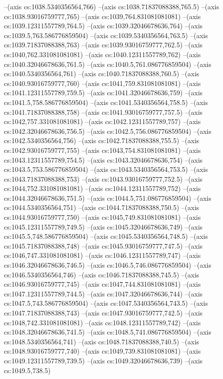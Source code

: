 --(axis cs:1038.5340356564,766)
--(axis cs:1038.71837088388,765.5)
--(axis cs:1038.93016759777,765)
--(axis cs:1039,764.831081081081)
--(axis cs:1039.12311557789,764.5)
--(axis cs:1039.32046678636,764)
--(axis cs:1039.5,763.586776859504)
--(axis cs:1039.5340356564,763.5)
--(axis cs:1039.71837088388,763)
--(axis cs:1039.93016759777,762.5)
--(axis cs:1040,762.331081081081)
--(axis cs:1040.12311557789,762)
--(axis cs:1040.32046678636,761.5)
--(axis cs:1040.5,761.086776859504)
--(axis cs:1040.5340356564,761)
--(axis cs:1040.71837088388,760.5)
--(axis cs:1040.93016759777,760)
--(axis cs:1041,759.831081081081)
--(axis cs:1041.12311557789,759.5)
--(axis cs:1041.32046678636,759)
--(axis cs:1041.5,758.586776859504)
--(axis cs:1041.5340356564,758.5)
--(axis cs:1041.71837088388,758)
--(axis cs:1041.93016759777,757.5)
--(axis cs:1042,757.331081081081)
--(axis cs:1042.12311557789,757)
--(axis cs:1042.32046678636,756.5)
--(axis cs:1042.5,756.086776859504)
--(axis cs:1042.5340356564,756)
--(axis cs:1042.71837088388,755.5)
--(axis cs:1042.93016759777,755)
--(axis cs:1043,754.831081081081)
--(axis cs:1043.12311557789,754.5)
--(axis cs:1043.32046678636,754)
--(axis cs:1043.5,753.586776859504)
--(axis cs:1043.5340356564,753.5)
--(axis cs:1043.71837088388,753)
--(axis cs:1043.93016759777,752.5)
--(axis cs:1044,752.331081081081)
--(axis cs:1044.12311557789,752)
--(axis cs:1044.32046678636,751.5)
--(axis cs:1044.5,751.086776859504)
--(axis cs:1044.5340356564,751)
--(axis cs:1044.71837088388,750.5)
--(axis cs:1044.93016759777,750)
--(axis cs:1045,749.831081081081)
--(axis cs:1045.12311557789,749.5)
--(axis cs:1045.32046678636,749)
--(axis cs:1045.5,748.586776859504)
--(axis cs:1045.5340356564,748.5)
--(axis cs:1045.71837088388,748)
--(axis cs:1045.93016759777,747.5)
--(axis cs:1046,747.331081081081)
--(axis cs:1046.12311557789,747)
--(axis cs:1046.32046678636,746.5)
--(axis cs:1046.5,746.086776859504)
--(axis cs:1046.5340356564,746)
--(axis cs:1046.71837088388,745.5)
--(axis cs:1046.93016759777,745)
--(axis cs:1047,744.831081081081)
--(axis cs:1047.12311557789,744.5)
--(axis cs:1047.32046678636,744)
--(axis cs:1047.5,743.586776859504)
--(axis cs:1047.5340356564,743.5)
--(axis cs:1047.71837088388,743)
--(axis cs:1047.93016759777,742.5)
--(axis cs:1048,742.331081081081)
--(axis cs:1048.12311557789,742)
--(axis cs:1048.32046678636,741.5)
--(axis cs:1048.5,741.086776859504)
--(axis cs:1048.5340356564,741)
--(axis cs:1048.71837088388,740.5)
--(axis cs:1048.93016759777,740)
--(axis cs:1049,739.831081081081)
--(axis cs:1049.12311557789,739.5)
--(axis cs:1049.32046678636,739)
--(axis cs:1049.5,738.5)
